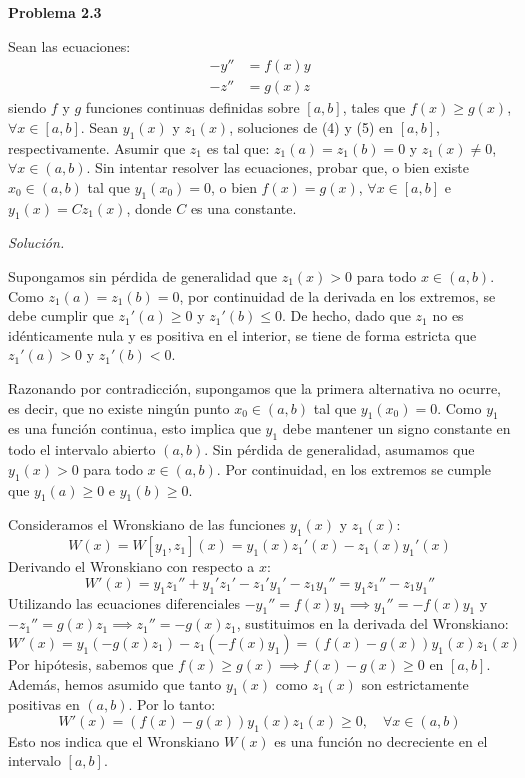 \documentclass[12pt,letterpaper]{article}
\begin{document}
\bigskip

\textbf{Problema 2.3}

\medskip
Sean las ecuaciones:
\begin{align}
  -y'' &= f(x)y \\
  -z'' &= g(x)z
\end{align}
siendo $f$ y $g$ funciones continuas definidas sobre $[a, b]$, tales que $f(x) \ge g(x)$, $\forall x \in [a, b]$.
Sean $y_1(x)$ y $z_1(x)$, soluciones de (4) y (5) en $[a, b]$, respectivamente. Asumir que $z_1$ es tal que: $z_1(a) = z_1(b) = 0$ y $z_1(x) \neq 0$, $\forall x \in (a, b)$.
Sin intentar resolver las ecuaciones, probar que, o bien existe $x_0 \in (a, b)$ tal que $y_1(x_0) = 0$, o bien $f(x) = g(x)$, $\forall x \in [a, b]$ e $y_1(x) = C z_1(x)$, donde $C$ es una constante.

\medskip
\textit{Solución.}

Supongamos sin pérdida de generalidad que $z_1(x) > 0$ para todo $x \in (a, b)$. Como $z_1(a) = z_1(b) = 0$, por continuidad de la derivada en los extremos, se debe cumplir que $z_1'(a) \ge 0$ y $z_1'(b) \le 0$. De hecho, dado que $z_1$ no es idénticamente nula y es positiva en el interior, se tiene de forma estricta que $z_1'(a) > 0$ y $z_1'(b) < 0$.

Razonando por contradicción, supongamos que la primera alternativa no ocurre, es decir, que no existe ningún punto $x_0 \in (a, b)$ tal que $y_1(x_0) = 0$. Como $y_1$ es una función continua, esto implica que $y_1$ debe mantener un signo constante en todo el intervalo abierto $(a, b)$. Sin pérdida de generalidad, asumamos que $y_1(x) > 0$ para todo $x \in (a, b)$. Por continuidad, en los extremos se cumple que $y_1(a) \ge 0$ e $y_1(b) \ge 0$.

Consideramos el Wronskiano de las funciones $y_1(x)$ y $z_1(x)$:
\[
  W(x) = W[y_1, z_1](x) = y_1(x) z_1'(x) - z_1(x) y_1'(x)
\]
Derivando el Wronskiano con respecto a $x$:
\[
  W'(x) = y_1 z_1'' + y_1' z_1' - z_1' y_1' - z_1 y_1'' = y_1 z_1'' - z_1 y_1''
\]
Utilizando las ecuaciones diferenciales $-y_1'' = f(x)y_1 \implies y_1'' = -f(x)y_1$ y $-z_1'' = g(x)z_1 \implies z_1'' = -g(x)z_1$, sustituimos en la derivada del Wronskiano:
\[
  W'(x) = y_1 (-g(x)z_1) - z_1 (-f(x)y_1) = (f(x) - g(x)) y_1(x) z_1(x)
\]
Por hipótesis, sabemos que $f(x) \ge g(x) \implies f(x) - g(x) \ge 0$ en $[a, b]$. Además, hemos asumido que tanto $y_1(x)$ como $z_1(x)$ son estrictamente positivas en $(a, b)$. Por lo tanto:
\[
  W'(x) = (f(x) - g(x)) y_1(x) z_1(x) \ge 0, \quad \forall x \in (a, b)
\]
Esto nos indica que el Wronskiano $W(x)$ es una función no decreciente en el intervalo $[a, b]$.
\end{document}
